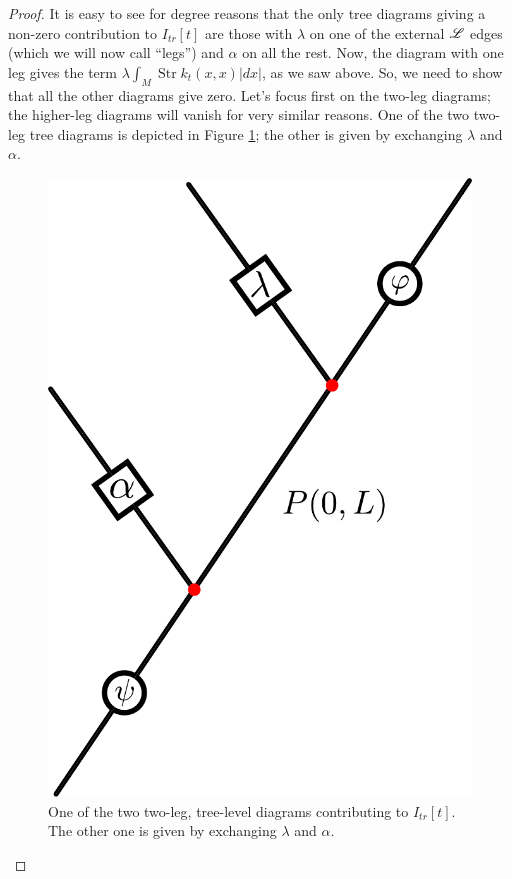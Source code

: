 \documentclass[11pt]{amsart}
\numberwithin{equation}{section}
\newcommand\Str{\operatorname{Str}}
\begin{document}
\begin{proof}
It is easy to see for degree reasons that the only tree diagrams giving a non-zero contribution to $I_{tr}[t]$ are those with $\lambda$ on one of the external $\mathscr L$ edges (which we will now call ``legs'') and $\alpha$ on all the rest. Now, the diagram with one leg gives the term $\lambda \int_M \Str k_t(x,x) |dx|$, as we saw above. So, we need to show that all the other diagrams give zero. Let's focus first on the two-leg diagrams; the higher-leg diagrams will vanish for very similar reasons. One of the two two-leg tree diagrams is depicted in Figure \ref{fig: twoleg}; the other is given by exchanging $\lambda$ and $\alpha$.

\begin{figure}[h]
\label{fig: twoleg}
\includegraphics[scale = 0.50]{TwoLegs}
\caption{One of the two two-leg, tree-level diagrams contributing to $I_{tr}[t]$. The other one is given by exchanging $\lambda$ and $\alpha$.}

\end{figure}
\end{proof}
\end{document}
